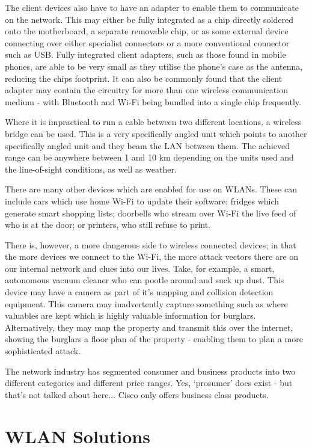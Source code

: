 The client devices also have to have an adapter to enable them to communicate on the network. This may either be fully integrated as a chip directly soldered onto the motherboard, a separate removable chip, or as some external device connecting over either specialist connectors or a more conventional connector such as USB. Fully integrated client adapters, such as those found in mobile phones, are able to be very small as they utilise the phone's case as the antenna, reducing the chips footprint. It can also be commonly found that the client adapter may contain the circuitry for more than one wireless communication medium - with Bluetooth and Wi-Fi being bundled into a single chip frequently. 

Where it is impractical to run a cable between two different locations, a wireless bridge can be used. This is a very specifically angled unit which points to another specifically angled unit and they beam the LAN between them. The achieved range can be anywhere between 1 and 10 km depending on the units used and the line-of-sight conditions, as well as weather. 

There are many other devices which are enabled for use on WLANs. These can include cars which use home Wi-Fi to update their software; fridges which generate smart shopping lists; doorbells who stream over Wi-Fi the live feed of who is at the door; or printers, who still refuse to print.

There is, however, a more dangerous side to wireless connected devices; in that the more devices we connect to the Wi-Fi, the more attack vectors there are on our internal network and clues into our lives. Take, for example, a smart, autonomous vacuum cleaner who can pootle around and suck up dust. This device may have a camera as part of it's mapping and collision detection equipment. This camera may inadvertently capture something such as where valuables are kept which is highly valuable information for burglars. Alternatively, they may map the property and transmit this over the internet, showing the burglars a floor plan of the property - enabling them to plan a more sophisticated attack. 

The network industry has segmented consumer and business products into two different categories and different price ranges. Yes, `prosumer' does exist - but that's not talked about here... Cisco only offers business class products. 

\section{WLAN Solutions}

